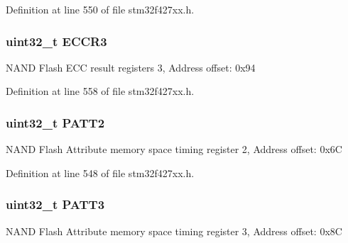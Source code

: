 Definition at line 550 of file stm32f427xx.\+h.

\subsubsection[{\texorpdfstring{E\+C\+C\+R3}{ECCR3}}]{ uint32\+\_\+t E\+C\+C\+R3}\hypertarget{struct_f_m_c___bank2__3___type_def_a6062be7dc144c07e01c303cb49d69ce2}{}\label{struct_f_m_c___bank2__3___type_def_a6062be7dc144c07e01c303cb49d69ce2}
N\+A\+ND Flash E\+CC result registers 3, Address offset\+: 0x94 

Definition at line 558 of file stm32f427xx.\+h.

\subsubsection[{\texorpdfstring{P\+A\+T\+T2}{PATT2}}]{ uint32\+\_\+t P\+A\+T\+T2}\hypertarget{struct_f_m_c___bank2__3___type_def_a9c1bc909ec5ed32df45444488ea6668b}{}\label{struct_f_m_c___bank2__3___type_def_a9c1bc909ec5ed32df45444488ea6668b}
N\+A\+ND Flash Attribute memory space timing register 2, Address offset\+: 0x6C 

Definition at line 548 of file stm32f427xx.\+h.

\subsubsection[{\texorpdfstring{P\+A\+T\+T3}{PATT3}}]{ uint32\+\_\+t P\+A\+T\+T3}\hypertarget{struct_f_m_c___bank2__3___type_def_aba03fea9c1bb2242d963e29f1b94d25e}{}\label{struct_f_m_c___bank2__3___type_def_aba03fea9c1bb2242d963e29f1b94d25e}
N\+A\+ND Flash Attribute memory space timing register 3, Address offset\+: 0x8C 

